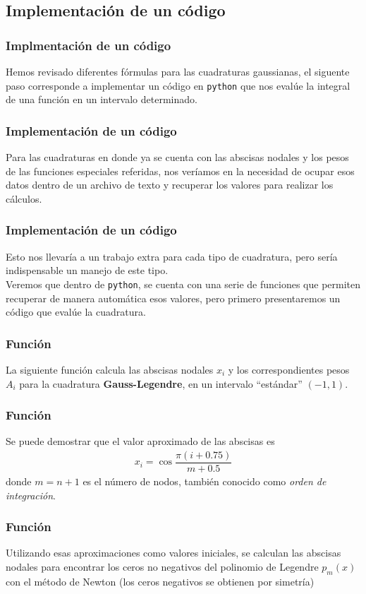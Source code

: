 \subsection*{Implementación de un código}
\begin{frame}
\frametitle{Implmentación de un código}
Hemos revisado diferentes fórmulas para las cuadraturas gaussianas, el siguente paso corresponde a implementar un código en \texttt{python} que nos evalúe la integral de una función en un intervalo determinado.
\end{frame}
\begin{frame}
\frametitle{Implementación de un código}
Para las cuadraturas en donde ya se cuenta con las abscisas nodales y los pesos de las funciones especiales referidas, nos veríamos en la necesidad de ocupar esos datos dentro de un archivo de texto y recuperar los valores para realizar los cálculos.
\end{frame}
\begin{frame}
\frametitle{Implementación de un código}
Esto nos llevaría a un trabajo extra para cada tipo de cuadratura, pero sería indispensable un manejo de este tipo.
\\
\bigskip
Veremos que dentro de \texttt{python}, se cuenta con una serie de funciones que permiten recuperar de manera automática esos valores, pero primero presentaremos un código que evalúe la cuadratura.
\end{frame}
\begin{frame}
\frametitle{Función }
La siguiente función  calcula las abscisas nodales $x_{i}$ y los correspondientes pesos $A_{i}$ para la cuadratura \textbf{Gauss-Legendre}, en un intervalo \enquote{estándar} $(-1, 1)$.
\end{frame}
\begin{frame}
\frametitle{Función }
Se puede demostrar que el valor aproximado de las abscisas es
\begin{align*}
x_{i} = \cos \dfrac{\pi (i + 0.75)}{m + 0.5}
\end{align*}
donde $m = n + 1$ es el número de nodos, también conocido como \emph{orden de integración}.
\end{frame}
\begin{frame}
\frametitle{Función }
Utilizando esas aproximaciones como valores iniciales, se calculan las abscisas nodales para encontrar los ceros no negativos del polinomio de Legendre $p_{m}(x)$ con el método de Newton (los ceros negativos se obtienen por simetría)
\end{frame}
